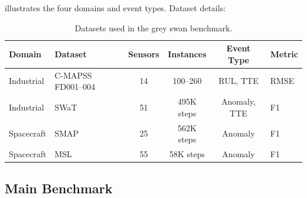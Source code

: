 \documentclass{article}
\begin{document}
 illustrates the four domains and event types. Dataset details:

\begin{table}[h]
\centering
\caption{Datasets used in the grey swan benchmark.}
\label{tab:datasets}
\small
\setlength{\tabcolsep}{3pt}
\begin{tabular}{@{}llcccl@{}}
\toprule
Domain & Dataset & Sensors & Instances & Event Type & Metric \\
\midrule
Industrial & C-MAPSS FD001--004~\citep{saxena2008cmapss} & 14 & 100--260 & RUL, TTE & RMSE \\
Industrial & SWaT~\citep{swat2016} & 51 & 495K steps & Anomaly, TTE & F1 \\
Spacecraft & SMAP~\citep{hundman2018smapmsl} & 25 & 562K steps & Anomaly & F1 \\
Spacecraft & MSL~\citep{hundman2018smapmsl} & 55 & 58K steps & Anomaly & F1 \\
\bottomrule
\end{tabular}
\end{table}

\subsection{Main Benchmark}
\label{sec:benchmark}
\end{document}
